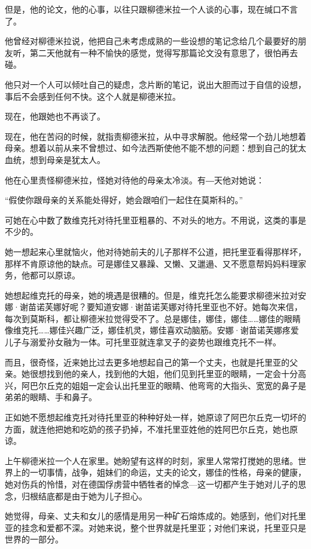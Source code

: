 但是，他的论文，他的心事，以往只跟柳德米拉一个人谈的心事，现在缄口不言了。

他曾经对柳德米拉说，他把自己未考虑成熟的一些设想的笔记念给几个最要好的朋友听，第二天他就有一种不愉快的感觉，觉得写那篇论文没有意思了，很怕再去碰。

他只对一个人可以倾吐自己的疑虑，念片断的笔记，说出大胆而过于自信的设想，事后不会感到任何不快。这个人就是柳德米拉。

现在，他跟她也不再谈了。

现在，他在苦闷的时候，就指责柳德米拉，从中寻求解脱。他经常一个劲儿地想着母亲。想着以前从来不曾想过、如今法西斯使他不能不想的问题：想到自己的犹太血统，想到母亲是犹太人。

他在心里责怪柳德米拉，怪她对待他的母亲太冷淡。有―天他对她说：

“假使你跟母亲的关系能处得好，她会跟咱们一起住在莫斯科的。”

可她在心中数了数维克托对待托里亚粗暴的、不对头的地方。不用说，这类的事是不少的。

她一想起来心里就恼火，他对待她前夫的儿子那样不公道，把托里亚看得那样坏，那样不肯原谅他的缺点。可是娜佳又暴躁、又懒、又邋遢、又不愿意帮妈妈料理家务，他都可以原谅。

她想起维克托的母亲，她的境遇是很糟的。但是，维克托怎么能要求柳德米拉对安娜·谢苗诺芙娜好呢？要知道安娜·谢苗诺芙娜对待托里亚也不好。她每次来信，每次到莫斯科，都让柳德米拉觉得受不了。总是娜佳，娜佳，娜佳……娜佳的眼睛像维克托……娜佳兴趣广泛，娜佳机灵，娜佳喜欢动脑筋。安娜·谢苗诺芙娜疼爱儿子与溺爱孙女融为一体。可托里亚就连拿叉子的姿势也跟维克托不一样。

而且，很奇怪，近来她比过去更多地想起自己的第一个丈夫，也就是托里亚的父亲。她很想找到他的亲人，找到他的大姐，他们见到托里亚的眼睛，一定会十分高兴，阿巴尔丘克的姐姐一定会认出托里亚的眼睛、他弯弯的大指头、宽宽的鼻子是弟弟的眼睛、手和鼻子。

正如她不愿想起维克托对待托里亚的种种好处一样，她原谅了阿巴尔丘克一切坏的方面，就连他把她和吃奶的孩子扔掉，不准托里亚姓他的姓阿巴尔丘克，她也原谅。

上午柳德米拉一个人在家里。她盼望有这样的时刻，家里人常常打搅她的思绪。世界上的一切事情，战争，姐妹们的命运，丈夫的论文，娜佳的性格，母亲的健康，她对伤兵的怜惜，对在德国俘虏营中牺牲者的悼念—这一切都产生于她对儿子的思念，归根结底都是由于她为儿子担心。

她觉得，母亲、丈夫和女儿的感情是用另一种矿石熔炼成的。她感到，他们对托里亚的挂念和爱都不深。对她来说，整个世界就是托里亚；对他们来说，托里亚只是世界的一部分。


